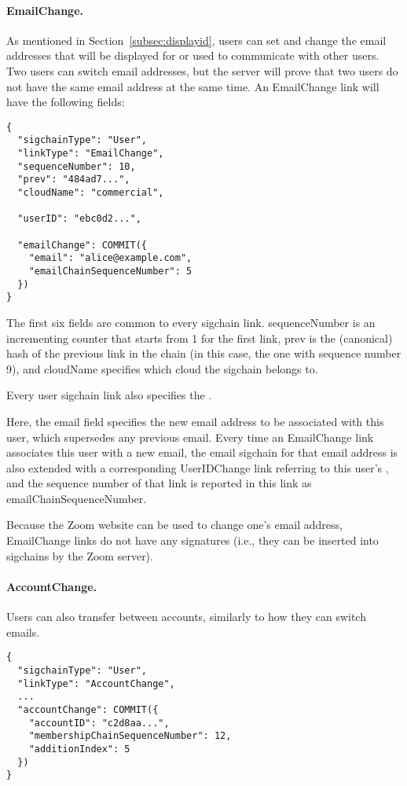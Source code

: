 \paragraph{EmailChange.} As mentioned in Section~\ref{subsec:displayid}, users can set and change
the email addresses that will be displayed for or used to communicate with other users. Two users
can switch email addresses, but the server will prove that two users do not have the same email
address at the same time. An \textsf{EmailChange} link will have the following fields:


\begin{Verbatim}
{
  "sigchainType": "User",
  "linkType": "EmailChange",
  "sequenceNumber": 10,
  "prev": "484ad7...",
  "cloudName": "commercial",

  "userID": "ebc0d2...",

  "emailChange": COMMIT({
    "email": "alice@example.com",
    "emailChainSequenceNumber": 5
  })
}
\end{Verbatim}

The first six fields are common to every sigchain link. \textsf{sequenceNumber} is an incrementing
counter that starts from 1 for the first link, \textsf{prev} is the (canonical) hash of the previous
link in the chain (in this case, the one with sequence number 9), and \textsf{cloudName} specifies
which cloud the sigchain belongs to.

Every user sigchain link also specifies the \userID.

Here, the \textsf{email} field specifies the new email address to be associated with this user,
which supersedes any previous email. Every time an \textsf{EmailChange} link associates this user
with a new email, the email sigchain for that email address is also extended with a corresponding
\textsf{UserIDChange} link referring to this user's \userID, and the sequence number of that link is
reported in this link as \textsf{emailChainSequenceNumber}.

Because the Zoom website can be used to change one's email address, \textsf{EmailChange} links do
not have any signatures (i.e., they can be inserted into sigchains by the Zoom server).

\paragraph{AccountChange.} Users can also transfer between accounts, similarly to how they can
switch emails.

\begin{Verbatim}
{
  "sigchainType": "User",
  "linkType": "AccountChange",
  ...
  "accountChange": COMMIT({
    "accountID": "c2d8aa...",
    "membershipChainSequenceNumber": 12,
    "additionIndex": 5
  })
}
\end{Verbatim}

